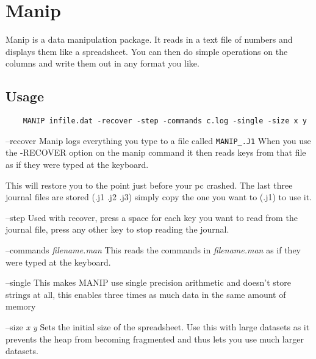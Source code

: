 \section{Manip}
%
Manip is a data manipulation package.  It reads in a text
file of numbers and displays them like a spreadsheet.
You can then do simple operations on the columns and write
them out in any format you like.

\subsection{Usage}
\begin{verbatim}
    MANIP infile.dat -recover -step -commands c.log -single -size x y
\end{verbatim}

\begin{commanddescription}
\item[{\sf --recover}]
Manip logs everything you type to a file called \verb#MANIP_.J1#
When you use the {\sf -RECOVER} option on the manip command it then
reads keys from that file as if they were typed at the keyboard.

This will restore you to the 
point just before your pc crashed.
The last three journal files are stored (.j1 .j2 .j3)
simply copy the one you want to (.j1) to use it.

\item[{\sf --step}]
Used with recover,  press a space for each key you
want to read from the journal file,  press any other
key to stop reading the journal.

\item[{\sf --commands {\it filename.man}}]
This reads the commands in {\it filename.man} as if they
were typed at the keyboard.

\item[{\sf --single}]
This makes {\sf MANIP} use single precision arithmetic
and doesn't store strings at all, this enables
three times as much data in the same amount of memory

\item[{\sf --size {\it x y}}]
Sets the initial size of the spreadsheet.  Use this
with large datasets as it prevents the heap from
becoming fragmented and thus lets you use much
larger datasets.
\end{commanddescription}

